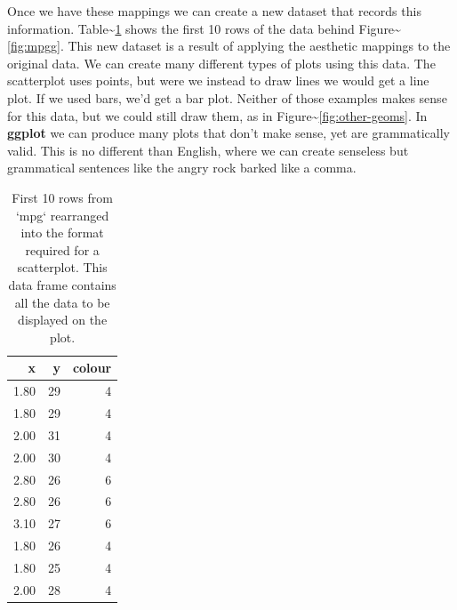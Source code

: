 Once we have these mappings we can create a new dataset that records
this information. Table\textasciitilde{}\ref{tbl:mapping} shows the
first 10 rows of the data behind Figure\textasciitilde{}\ref{fig:mpgg}.
This new dataset is a result of applying the aesthetic mappings to the
original data. We can create many different types of plots using this
data. The scatterplot uses points, but were we instead to draw lines we
would get a line plot. If we used bars, we'd get a bar plot. Neither of
those examples makes sense for this data, but we could still draw them,
as in Figure\textasciitilde{}\ref{fig:other-geoms}. In \textbf{ggplot}
we can produce many plots that don't make sense, yet are grammatically
valid. This is no different than English, where we can create senseless
but grammatical sentences like the angry rock barked like a comma.

\begin{table}[ht]
\centering
\begin{tabular}{rrr}
  \hline
x & y & colour \\ 
  \hline
1.80 &  29 &   4 \\ 
  1.80 &  29 &   4 \\ 
  2.00 &  31 &   4 \\ 
  2.00 &  30 &   4 \\ 
  2.80 &  26 &   6 \\ 
  2.80 &  26 &   6 \\ 
  3.10 &  27 &   6 \\ 
  1.80 &  26 &   4 \\ 
  1.80 &  25 &   4 \\ 
  2.00 &  28 &   4 \\ 
   \hline
\end{tabular}
\caption{First 10 rows from `mpg` rearranged into the format required for a scatterplot.  This data frame contains all the data to be displayed on the plot.} 
\label{tbl:mapping}
\end{table}

\begin{Shaded}
\begin{Highlighting}[]
   \NormalTok{) +}\StringTok{ }
\StringTok{  }\NormalTok{(} \NormalTok{)}
   \NormalTok{, }
   \NormalTok{, } \NormalTok{) +}\StringTok{ }
\StringTok{  }\NormalTok{(} \NormalTok{)}
\end{Highlighting}
\end{Shaded}

